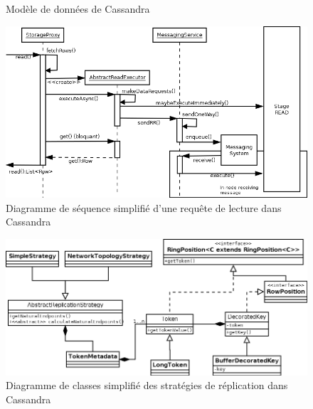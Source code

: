 \documentclass[12pt]{article}
\begin{document}
\begin{figure}[p]
	\centering
		
	\caption{Modèle de données de Cassandra \label{fig:keyspace}}
\end{figure}

\begin{figure}[p]
	\centering
		\includegraphics[width=15cm]{images/architecture/read_diagram.png}
	\caption{Diagramme de séquence simplifié d'une requête de lecture dans Cassandra \label{fig:read_diagram}}
\end{figure}

\begin{figure}[p]
	\centering
		\includegraphics[width=15cm]{images/architecture/replication_diagram.png}
	\caption{Diagramme de classes simplifié des stratégies de réplication dans Cassandra \label{fig:replication_diagram}}
\end{figure}

\clearpage

\end{document}
